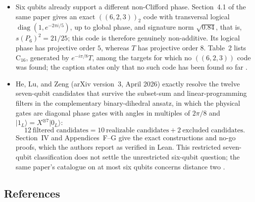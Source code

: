 \begin{itemize}
  \item Six qubits already support a different non-Clifford phase.  Section~4.1 of
  the same paper gives an exact $((6,2,3))_2$ code with transversal logical
  $\operatorname{diag}(1,e^{-2\pi i/5})$, up to global phase, and signature norm
  $\sqrt{0.84}$, that is, $s(P_6)^2=21/25$; this code is therefore genuinely
  non-additive.  Its logical phase has projective order $5$, whereas $T$ has
  projective order $8$.  Table~2 lists $\mathrm C_{16}$, generated by
  $e^{-i\pi/8}T$, among the targets for which no $((6,2,3))$ code was found; the
  caption states only that no such code has been found so far
  .

  \item He, Lu, and Zeng (arXiv version~3, April 2026) exactly resolve the twelve
  seven-qubit candidates that survive the subset-sum and linear-programming
  filters in the complementary binary-dihedral ansatz, in which the physical
  gates are diagonal phase gates with angles in multiples of $2\pi/8$ and
  $\lvert1_L\rangle=X^{\otimes7}\lvert0_L\rangle$:
  \begin{equation}
    12\ \text{filtered candidates}
    =10\ \text{realizable candidates}+2\ \text{excluded candidates}.
    \label{eq:ddfb-classification}
  \end{equation}
  Section~IV and Appendices~F--G give the exact constructions and no-go proofs,
  which the authors report as verified in Lean.  This restricted seven-qubit
  classification does not settle the unrestricted six-qubit question; the same
  paper's catalogue on at most six qubits concerns distance two
  .
\end{itemize}

\subsection*{References}

